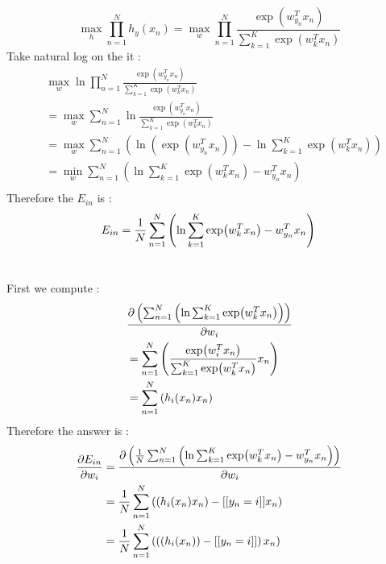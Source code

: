 \documentclass[12pt,a4paper]{article}
\begin{document}
\[
		\max_{h} \prod_{n=1}^{N} h_{y}\left(x_{n}\right) 
		= \max_{w} \prod_{n=1}^{N}
			\frac{\exp({w}_{y_{n}}^{T}x_{n})}{\sum_{k=1}^{K} \exp({w}_{k}^{T}x_{n})}
\]
Take natural log on the it :
\[
	\begin{aligned}
		& \max_{w} \ln \prod_{n=1}^{N}
			\frac{\exp({w}_{y_{n}}^{T}x_{n})}{\sum_{k=1}^{K} \exp({w}_{k}^{T}x_{n})} \\
		&= \max_{w} \sum_{n=1}^{N} \ln
			\frac{\exp({w}_{y_{n}}^{T}x_{n})}{\sum_{k=1}^{K} \exp({w}_{k}^{T}x_{n})} \\
		&= \max_{w} \sum_{n=1}^{N} \left( \ln( \exp({w}_{y_{n}}^{T}x_{n}) ) -
			\ln\sum_{k=1}^{K} \exp({w}_{k}^{T}x_{n}) \right) \\
		&= \min_{w} \sum_{n=1}^{N} \left( \ln\sum_{k=1}^{K} \exp({w}_{k}^{T}x_{n}) -
			{w}_{y_{n}}^{T}x_{n} \right) \\
	\end{aligned}
\]
Therefore the $E_{in}$ is :
\[
	E_{in} = \frac{1}{N} \sum_{n=1}^{N} \left( \ln \sum_{k=1}^{K} \exp({w}_{k}^{T}x_{n}) -
		{w}_{y_{n}}^{T}x_{n} \right) \\
\]

\section{} %

First we compute :
\[
	\begin{aligned}
		& \pdv{\left(\sum_{n=1}^{N} \left( \ln\sum_{k=1}^{K}
			\exp({w}_{k}^{T} x_{n})\right)\right)}{w_{i}} \\
		&= \sum_{n=1}^{N} \left( \frac{\exp({w}_{i}^{T} x_{n})}
			{\sum_{k=1}^{K} \exp({w}_{k}^{T} x_{n})}x_{n} \right) \\
		&= \sum_{n=1}^{N} \left( h_{i}(x_{n}) x_{n} \right) \\
	\end{aligned}
\]
Therefore the answer is :
\[
	\begin{aligned}
		\pdv{E_{in}}{w_{i}}
			&= \pdv{\left(\frac{1}{N} \sum_{n=1}^{N} \left( \ln \sum_{k=1}^{K} \exp({w}_{k}^{T}x_{n}) -
			{w}_{y_{n}}^{T}x_{n} \right) \right)}{w_{i}} \\
		&= \frac{1}{N} \sum_{n=1}^{N} \left( \left( h_{i}(x_{n}) x_{n} \right) -
			[[y_{n}=i]] x_{n} \right) \\
		&= \frac{1}{N} \sum_{n=1}^{N} \left( \left( \left( h_{i}(x_{n}) \right) -
			[[y_{n}=i]] \right) x_{n} \right) \\
	\end{aligned}
\]
\end{document}
